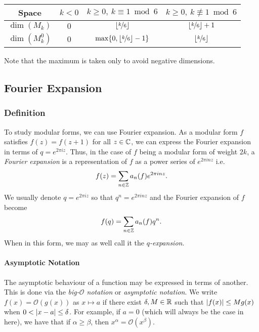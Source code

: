 \begin{center}
\begin{tabular}{||c||c|c|c||} 
    \hline
    Space & $k<0$ & $k \geq 0, \ k \equiv 1 \bmod 6$ & $k \geq 0, \ k \not \equiv 1 \bmod 6$ \\
    \hline
    \hline
    $\dim(M_k)$ & $0$ & $\lfloor \nicefrac{k}{6} \rfloor$ & $\lfloor \nicefrac{k}{6} \rfloor + 1$ \\
    \hline
    $\dim(M_k^0)$ & $0$ & $\max\{0, \lfloor \nicefrac{k}{6} \rfloor - 1\}$ & $\lfloor \nicefrac{k}{6} \rfloor$ \\
    \hline
\end{tabular}
\end{center}
Note that the maximum is taken only to avoid negative dimensions.



\subsection{Fourier Expansion}
\subsubsection{Definition}
To study modular forms, we can use Fourier expansion.
As a modular form $f$ satisfies $f(z) = f(z+1)$ for all $z \in \mathbb{C}$, we can express the Fourier expansion in terms of $q = e^{2 \pi i z}$.
Thus, in the case of $f$ being a modular form of weight $2k$, 
a \textit{Fourier expansion} is a representation of $f$ as a power series of $e^{2\pi i n z}$
i.e. $$f(z) = \sum_{n \in \mathbb{Z}} a_n(f) e^{2\pi inz}.$$
We usually denote $q = e^{2\pi i z}$ so that $q^n = e^{2\pi i n z}$ 
and the Fourier expansion of $f$ become 
$$
f(q) = \sum_{n \in \mathbb{Z}} a_n(f) q^n.
$$
When in this form, we may as well call it the \textit{$q$-expansion}.

\paragraph{Asymptotic Notation}
The asymptotic behaviour of a function may be expressed in terms of another.
This is done via the \textit{big-$\mathcal{O}$ notation} or \textit{asymptotic notation}.
We write $f(x) = \mathcal{O}(g(x))$ as $x \mapsto a$ if there exist $\delta, M \in \mathbb{R}$ such that $| f(x) | \leq Mg(x)$ when $0 < | x-a | \leq \delta$.
For example, if $a=0$ (which will always be the case in here), we have that if $\alpha \geq \beta$, then $x^{\alpha} = \mathcal{O}(x^{\beta})$.

